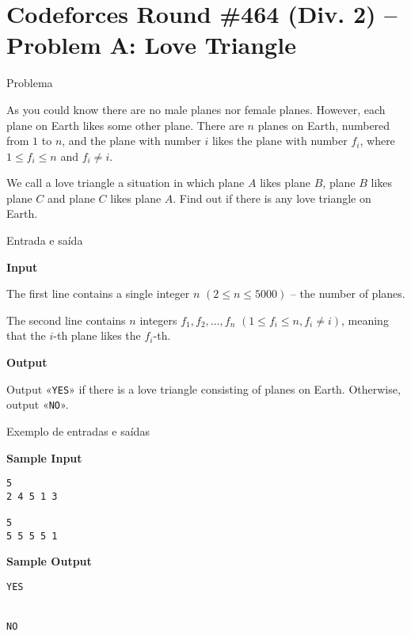 \section{Codeforces Round \#464 (Div. 2) -- Problem A: Love Triangle}

\begin{frame}[fragile]{Problema}

As you could know there are no male planes nor female planes. However, each plane on Earth likes 
some other plane. There are $n$ planes on Earth, numbered from $1$ to $n$, and the plane with 
number $i$ likes the plane with number $f_i$, where $1\leq f_i\leq n$ and $f_i\neq i$.

We call a love triangle a situation in which plane $A$ likes plane $B$, plane $B$ likes plane $C$
and plane $C$ likes plane $A$. Find out if there is any love triangle on Earth.

\end{frame}

\begin{frame}[fragile]{Entrada e saída}

\textbf{Input}

The first line contains a single integer $n$ $(2\leq n\leq 5000)$ -- the number of planes.

The second line contains $n$ integers $f_1, f_2, \ldots, f_n$ $(1\leq f_i\leq n, f_i\neq i)$, 
meaning that the $i$-th plane likes the $f_i$-th.

\textbf{Output}

Output «\texttt{YES}» if there is a love triangle consisting of planes on Earth. Otherwise, output 
«\texttt{NO}».

\end{frame}

\begin{frame}[fragile]{Exemplo de entradas e saídas}

\begin{minipage}[t]{0.5\textwidth}
\textbf{Sample Input}
\begin{verbatim}
5
2 4 5 1 3

5
5 5 5 5 1
\end{verbatim}
\end{minipage}
\begin{minipage}[t]{0.45\textwidth}
\textbf{Sample Output}
\begin{verbatim}
YES


NO
\end{verbatim}
\end{minipage}
\end{frame}

